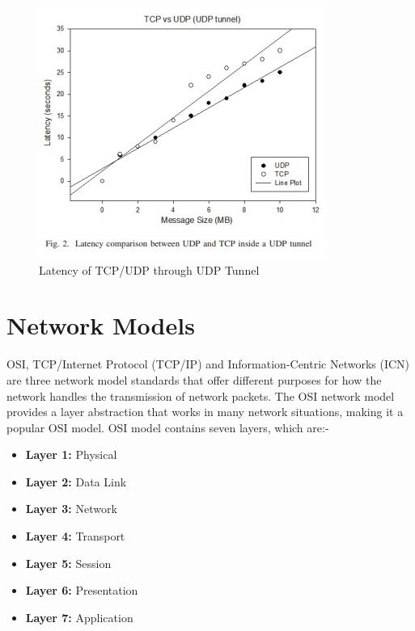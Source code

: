 \documentclass[conference]{IEEEtran}
\begin{document}
      \begin{figure}[h]
        \centering
        \includegraphics[width=\columnwidth]{Figures/TCPUDP-UDPTUN.png}
        \caption{Latency of TCP/UDP through UDP Tunnel~\cite{coonjah_experimental_2015}}
        \label{fig:tcpudp-udptun}
      \end{figure}


    \section{Network Models}
    \label{sec:networkModel}
      OSI, TCP/Internet Protocol (TCP/IP) and Information-Centric Networks (ICN) are three network model standards that offer different purposes for how the network handles the transmission of network packets. The OSI network model provides a layer abstraction that works in many network situations, making it a popular OSI model. OSI model contains seven layers, which are:-
      \begin{itemize}
        \centering
        \item[] \textbf{Layer 1:} Physical
        \item[] \textbf{Layer 2:} Data Link
        \item[] \textbf{Layer 3:} Network
        \item[] \textbf{Layer 4:} Transport
        \item[] \textbf{Layer 5:} Session
        \item[] \textbf{Layer 6:} Presentation
        \item[] \textbf{Layer 7:} Application
      \end{itemize}
\end{document}
